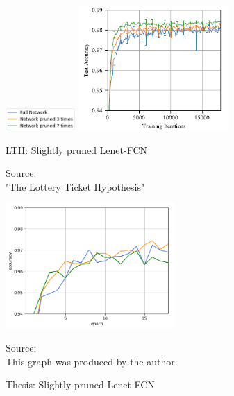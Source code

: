 \begin{figure}
	\begin{minipage}{\textwidth}
		\centering
		\includegraphics[width=100px]{gfx/7-Evaluation/LTH_1_legend.png}
	\end{minipage}
	\begin{minipage}{0.5\textwidth}
		\centering
		\includegraphics[height=180px]{gfx/7-Evaluation/LTH_1.png}
		\caption{LTH: Slightly pruned Lenet-FCN}
		\vspace{7pt}
		\footnotesize{
			Source:\\
			"The Lottery Ticket Hypothesis" \cite{LTH}
		}
		\label{fig:Slightly-Pruned-Lenet-LTH}
	\end{minipage}\hfill
	\begin{minipage}{0.5\textwidth}
		\centering
		\includegraphics[height=180px]{gfx/Experiments/Reproduction-MNIST-FCN/accuracy/LTH_1.png}
		\caption{Thesis: Slightly pruned Lenet-FCN}
		\vspace{7pt}
		\footnotesize{
			Source:\\
			This graph was produced by the author.
		}
		\label{fig:Slightly-Pruned-Lenet-Thesis}
	\end{minipage}
\end{figure}

